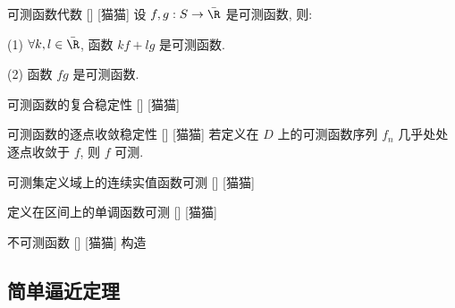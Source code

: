 \documentclass[UTF8]{ctexart}
\begin{document}
            \begin{ppt}
                {可测函数代数}
                []
                [猫猫]
                设 \(f,g:S\to\bar{\R}\) 是可测函数, 则: 
                
                (1) \(\forall k,l\in\bar{\R}\), 函数 \(k f+l g\) 是可测函数. 

                (2) 函数 \(fg\) 是可测函数. 
            \end{ppt}
            
            \begin{ppt}
                {可测函数的复合稳定性}
                []
                [猫猫]
            \end{ppt}
            
            \begin{ppt}
                {可测函数的逐点收敛稳定性}
                []
                [猫猫]
                若定义在 \(D\) 上的可测函数序列 \(f_n\) 几乎处处逐点收敛于 \(f\), 则 \(f\) 可测. 
            \end{ppt}
            
            \begin{xmp}
                {可测集定义域上的连续实值函数可测}
                []
                [猫猫]
            \end{xmp}
            
            \begin{xmp}
                {定义在区间上的单调函数可测}
                []
                [猫猫]
            \end{xmp}
            
            \begin{cxmp}
                {不可测函数}
                []
                [猫猫]
                构造
            \end{cxmp}

        \subsection{简单逼近定理} %
            
\end{document}
